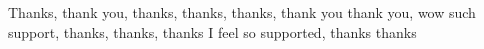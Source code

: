 Thanks, thank you, thanks, thanks, thanks, thank you thank you, wow such support, thanks, thanks, thanks I feel so supported, thanks thanks